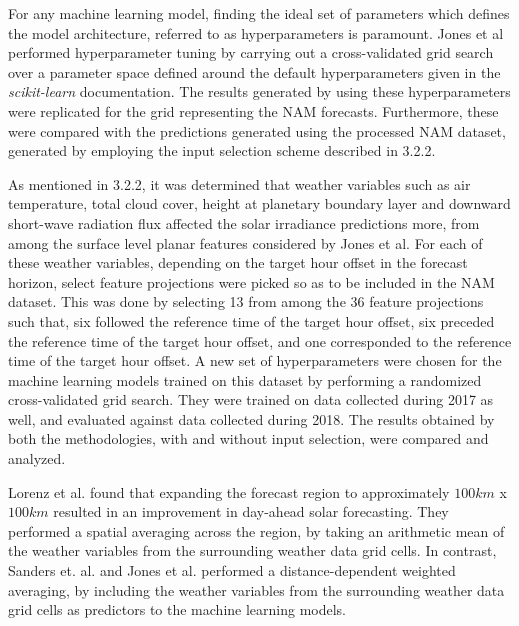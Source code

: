 \par For any machine learning model, finding the ideal set of parameters which defines the model architecture, referred to as hyperparameters is paramount. Jones et al performed hyperparameter tuning by carrying out a cross-validated grid search over a parameter space defined around the default hyperparameters given in the \textit{scikit-learn} documentation. The results generated by using these hyperparameters were replicated for the grid representing the NAM forecasts. Furthermore, these were compared with the predictions generated using the processed NAM dataset, generated by employing the input selection scheme described in 3.2.2.

\par As mentioned in 3.2.2, it was determined that weather variables such as air temperature, total cloud cover, height at planetary boundary layer and downward short-wave radiation flux affected the solar irradiance predictions more, from among the surface level planar features considered by Jones et al. For each of these weather variables, depending on the target hour offset in the forecast horizon, select feature projections were picked so as to be included in the NAM dataset. This was done by selecting 13 from among the 36 feature projections such that, six followed the reference time of the target hour offset, six preceded the reference time of the target hour offset, and one corresponded to the reference time of the target hour offset. A new set of hyperparameters were chosen for the machine learning models trained on this dataset by performing a randomized cross-validated grid search. 
They were trained on data collected during 2017 as well, and evaluated against data collected during 2018. The results obtained by both the methodologies, with and without input selection, were compared and analyzed.

\par Lorenz et al. \cite{expansion_lorenz} found that expanding the forecast region to approximately $100 km$ x $100 km$ resulted in an improvement in day-ahead solar forecasting. They performed a spatial averaging across the region, by taking  an arithmetic mean of the weather variables from the surrounding weather data grid cells. In contrast, Sanders et. al. \cite{publication_sanders} and Jones et al. \cite{thesis_zach} performed a distance-dependent weighted averaging, by including the weather variables from the surrounding weather data grid cells as predictors to the machine learning models.

